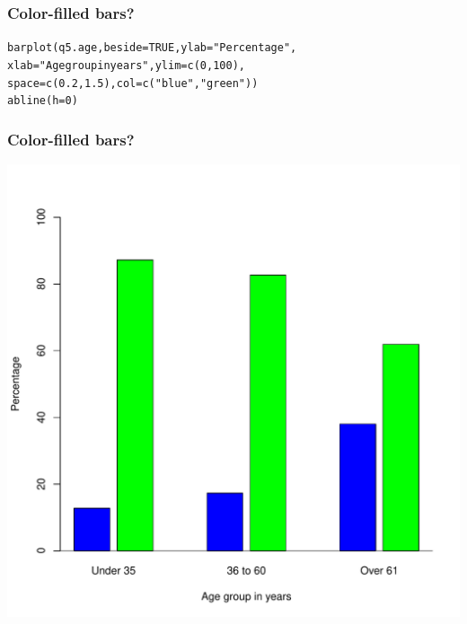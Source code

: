 \documentclass{beamer}\usepackage[]{graphicx}\usepackage[]{color}
\makeatletter
\newcommand{\hlnum}[1]{\textcolor[rgb]{0.533,0,0.133}{#1}}%
\newcommand{\hlstr}[1]{\textcolor[rgb]{0.667,0.267,0}{#1}}%
\newcommand{\hlstd}[1]{\textcolor[rgb]{0,0,0}{#1}}%
\newcommand{\hlkwc}[1]{\textcolor[rgb]{0,0,0.4}{#1}}%
\newcommand{\hlkwd}[1]{\textcolor[rgb]{0,0.267,0.4}{#1}}%
\newenvironment{kframe}{%
 \def\at@end@of@kframe{}%
 \ifinner\ifhmode%
  \def\at@end@of@kframe{\end{minipage}}%
  \begin{minipage}{\columnwidth}%
 \fi\fi%
 \def\FrameCommand##1{\hskip\@totalleftmargin \hskip-\fboxsep
 \colorbox{shadecolor}{##1}\hskip-\fboxsep
     \hskip-\linewidth \hskip-\@totalleftmargin \hskip\columnwidth}%
 \MakeFramed {\advance\hsize-\width
   \@totalleftmargin\z@ \linewidth\hsize
   \@setminipage}}%
 {\par\unskip\endMakeFramed%
 \at@end@of@kframe}
\newenvironment{knitrout}{}{} %
\makeatother
\begin{document}
\begin{frame}[fragile]
  \frametitle{Color-filled bars?}
\begin{knitrout}
\color{fgcolor}\begin{kframe}
\begin{alltt}
\hlkwd{barplot}\hlstd{(q5.age,} \hlkwc{beside} \hlstd{=} \hlnum{TRUE}\hlstd{,} \hlkwc{ylab} \hlstd{=} \hlstr{"Percentage"}\hlstd{,}
        \hlkwc{xlab} \hlstd{=} \hlstr{"Age group in years"}\hlstd{,} \hlkwc{ylim} \hlstd{=} \hlkwd{c}\hlstd{(}\hlnum{0}\hlstd{,} \hlnum{100}\hlstd{),}
        \hlkwc{space} \hlstd{=} \hlkwd{c}\hlstd{(}\hlnum{0.2}\hlstd{,} \hlnum{1.5}\hlstd{),} \hlkwc{col} \hlstd{=} \hlkwd{c}\hlstd{(}\hlstr{"blue"}\hlstd{,} \hlstr{"green"}\hlstd{))}
\hlkwd{abline}\hlstd{(}\hlkwc{h} \hlstd{=} \hlnum{0}\hlstd{)}
\end{alltt}
\end{kframe}
\end{knitrout}
\end{frame}

\begin{frame}[fragile]
  \frametitle{Color-filled bars?}
\begin{knitrout}
\color{fgcolor}

{\centering \includegraphics[width=0.6\linewidth]{figure/bar6-1} 

}



\end{knitrout}
\end{frame}
\end{document}
